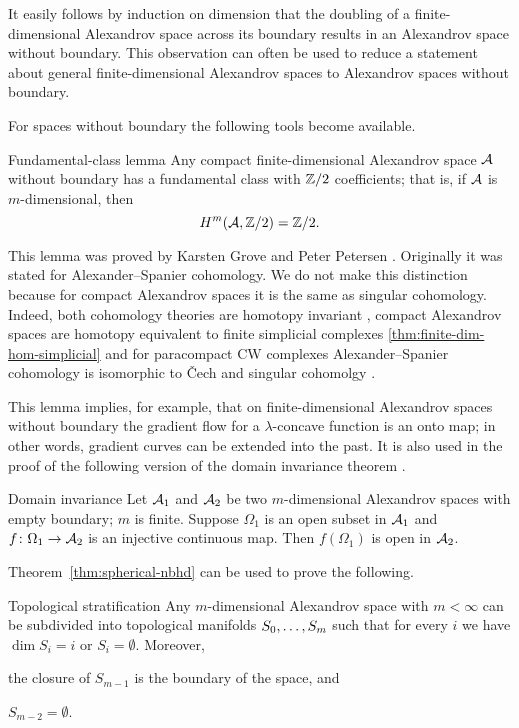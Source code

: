 It easily follows by induction on dimension  that the doubling of a finite-dimensional Alexandrov space across its boundary results in an Alexandrov space without boundary.
This observation can often be used to reduce a statement about general finite-dimensional Alexandrov spaces to  Alexandrov spaces without boundary.

For spaces without boundary the following tools become available.

\begin{thm}{Fundamental-class lemma}\label{lem:fund-class}
Any compact finite-dimensional Alexandrov space $\mathcal{A}$ without boundary has a fundamental class with $\mathbb{Z}/2$ coefficients;
that is, if $\mathcal{A}$ is $m$-dimensional, then
\[H^m(\mathcal{A},\mathbb{Z}/2)=\mathbb{Z}/2.\]

\end{thm}

This lemma was proved by Karsten Grove and Peter Petersen \cite{grove-petersen1993}.
Originally it was stated for Alexander--Spanier cohomology. We do not make this distinction  because for compact Alexandrov spaces it is the same as singular cohomology. Indeed,  both cohomology theories are homotopy invariant \cite[Chapter 6]{Spanier}, compact Alexandrov spaces are homotopy equivalent to finite simplicial complexes \ref{thm:finite-dim-hom-simplicial} and  for paracompact  CW complexes  Alexander--Spanier cohomology is isomorphic to \v{C}ech  and singular cohomolgy \cite[Chapter 6]{Spanier}.

This lemma implies, for example, that on finite-dimensional Alexandrov spaces without boundary 
the gradient flow for a $\lambda$-concave function is an onto map;
in other words, gradient curves can be extended into the past.
It is also used in the proof of the following version of the domain invariance theorem \cite[Theorem 3.2]{kapovitch-zhu}.

\begin{thm}{Domain invariance}\label{thm-inv-domain}
Let $\mathcal{A}_1$ and $\mathcal{A}_2$ be two $m$-dimensional Alexandrov spaces with empty boundary; $m$ is finite.
Suppose $\Omega_1$ is an open subset in $\mathcal{A}_1$ and $f\colon\Omega_1\to \mathcal{A}_2$ is an injective continuous map.
Then $f(\Omega_1)$ is open in $\mathcal{A}_2$.
\end{thm}

Theorem~\ref{thm:spherical-nbhd} can be used to prove the following. 

\begin{thm}{Topological stratification}\label{thm:top-stratification}
Any $m$-dimensional Alexandrov space with $m<\infty$ can be subdivided into topological manifolds $S_0,\dots,S_m$ such that for every $i$ we have $\dim S_i=i$ or $S_i=\emptyset$.
Moreover,
\begin{subthm}{}
the closure of $S_{m-1}$ is the boundary of the space, and
\end{subthm}

\begin{subthm}{}
$S_{m-2}=\emptyset$.
\end{subthm}

\end{thm}

